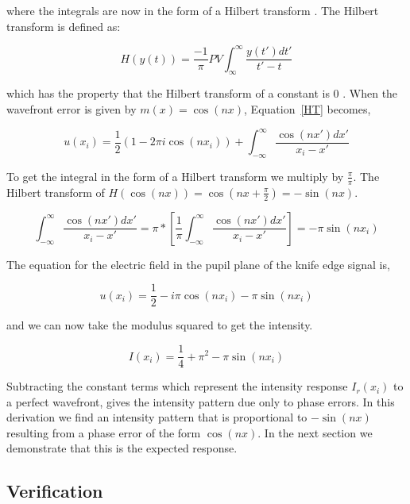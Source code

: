 \noindent where the integrals are now in the form of a Hilbert transform \citep{villa2014foucault}. The Hilbert transform is defined as:

\begin{equation}
    H(y(t))=\frac{-1}{\pi} PV\int_{\infty}^{\infty} \frac{y(t') dt'}{t'-t}
\end{equation}

\noindent which has the property that the Hilbert transform of a constant is 0 \citep{poularikas2018handbook}. When the wavefront error is given by $m(x)=\cos(nx)$, Equation~\ref{HT} becomes, 


\begin{equation}
    u(x_i)= \frac{1}{2}(1-2\pi i \cos(nx_i))+\int_{-\infty}^\infty \frac{ \cos(nx')dx'}{x_i-x'}
\end{equation}

To get the integral in the form of a Hilbert transform we multiply by $\frac{\pi}{\pi}$. The Hilbert transform of $H(\cos(nx))=\cos(nx+\frac{\pi}{2})=-\sin(nx)$.

\begin{equation}
\int_{-\infty}^\infty \frac{ \cos(nx')dx'}{x_i-x'}=\pi*[\frac{1}{\pi}\int_{-\infty}^\infty \frac{ \cos(nx')dx'}{x_i-x'}]=-\pi \sin(nx_i)
\end{equation}

The equation for the electric field in the pupil plane of the knife edge signal is,

\begin{equation}
   u(x_i)= \frac{1}{2}-i \pi \cos(nx_i) -\pi \sin(nx_i)
   \label{derivationResult}
\end{equation}

\noindent and we can now take the modulus squared to get the intensity.

\begin{equation}
    I(x_i)=\frac{1}{4}+\pi^2-\pi \sin(nx_i)
    \label{equationIntensityResult}
\end{equation}

Subtracting the constant terms which represent the intensity response $I_r (x_i )$ to a perfect wavefront, gives the intensity pattern due only to phase errors. In this derivation we find an intensity pattern that is proportional to $-\sin(nx)$ resulting from a phase error of the form $\cos(nx)$. In the next section we demonstrate that this is the expected response.

\subsection{Verification}


